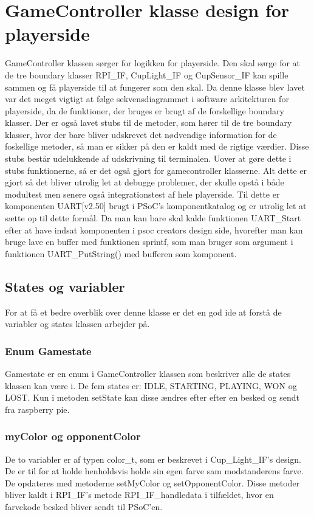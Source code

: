 \documentclass[Softwaredesign/Softwaredesign_main.tex]{subfiles}
\begin{document}
\section{GameController klasse design for playerside}
GameController klassen sørger for logikken for playerside. Den skal sørge for at de tre boundary klasser RPI\_IF, CupLight\_IF og CupSensor\_IF kan spille sammen og få playerside til at fungerer som den skal. Da denne klasse blev lavet var det meget vigtigt at følge sekvensdiagrammet i software arkitekturen for playerside, da de funktioner, der bruges er brugt af de forskellige boundary klasser. Der er også lavet stubs til de metoder, som hører til de tre boundary klasser, hvor der bare bliver udskrevet det nødvendige information for de foskellige metoder, så man er sikker på den er kaldt med de rigtige værdier. Disse stubs består udelukkende af udskrivning til terminalen. Uover at gøre dette i stubs funktionerne, så er det også gjort for gamecontroller klasserne. Alt dette er gjort så det bliver utrolig let at debugge problemer, der skulle opstå i både modultest men senere også integrationstest af hele playerside. Til dette er komponenten UART[v2.50] brugt i PSoC's komponentkatalog og er utrolig let at sætte op til dette formål. Da man kan bare skal kalde funktionen UART\_Start efter at have indsat komponenten i psoc creators design side, hvorefter man kan bruge lave en buffer med funktionen sprintf, som man bruger som argument i funktionen UART\_PutString() med bufferen som komponent. 
\subsection{States og variabler}
For at få et bedre overblik over denne klasse er det en god ide at forstå de variabler og states klassen arbejder på.
\subsubsection{Enum Gamestate}
Gamestate er en enum i GameController klassen som beskriver alle de states klassen kan være i. De fem states er: IDLE, STARTING, PLAYING, WON og LOST. Kun i metoden setState kan disse ændres efter efter en besked og sendt fra raspberry pie.
\subsubsection{myColor og opponentColor}
De to variabler er af typen color\_t, som er beskrevet i Cup\_Light\_IF's design. De er til for at holde henholdsvis holde sin egen farve sam modstanderens farve. De opdateres med metoderne setMyColor og setOpponentColor. Disse metoder bliver kaldt i RPI\_IF's metode RPI\_IF\_handledata i tilfældet, hvor en farvekode besked bliver sendt til PSoC'en. 
\end{document}
